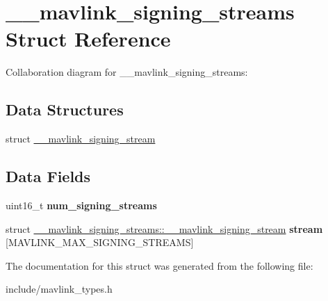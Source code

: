 \hypertarget{struct____mavlink__signing__streams}{}\section{\+\_\+\+\_\+mavlink\+\_\+signing\+\_\+streams Struct Reference}
\label{struct____mavlink__signing__streams}


Collaboration diagram for \+\_\+\+\_\+mavlink\+\_\+signing\+\_\+streams\+:
\subsection*{Data Structures}
\begin{DoxyCompactItemize}
\item 
struct \hyperlink{struct____mavlink__signing__streams_1_1____mavlink__signing__stream}{\+\_\+\+\_\+mavlink\+\_\+signing\+\_\+stream}
\end{DoxyCompactItemize}
\subsection*{Data Fields}
\begin{DoxyCompactItemize}
\item 
uint16\+\_\+t {\bfseries num\+\_\+signing\+\_\+streams}\hypertarget{struct____mavlink__signing__streams_ab06625f915dba94f982e5ac44abb8555}{}\label{struct____mavlink__signing__streams_ab06625f915dba94f982e5ac44abb8555}

\item 
struct \hyperlink{struct____mavlink__signing__streams_1_1____mavlink__signing__stream}{\+\_\+\+\_\+mavlink\+\_\+signing\+\_\+streams\+::\+\_\+\+\_\+mavlink\+\_\+signing\+\_\+stream} {\bfseries stream} \mbox{[}M\+A\+V\+L\+I\+N\+K\+\_\+\+M\+A\+X\+\_\+\+S\+I\+G\+N\+I\+N\+G\+\_\+\+S\+T\+R\+E\+A\+MS\mbox{]}\hypertarget{struct____mavlink__signing__streams_ae423b0c8b9d6ac0b2c7f0fa544c94b5e}{}\label{struct____mavlink__signing__streams_ae423b0c8b9d6ac0b2c7f0fa544c94b5e}

\end{DoxyCompactItemize}


The documentation for this struct was generated from the following file\+:\begin{DoxyCompactItemize}
\item 
include/mavlink\+\_\+types.\+h\end{DoxyCompactItemize}

